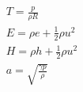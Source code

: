 \documentclass[10pt]{article} %
\begin{document}
\color{fgC}\[\begin{matrix}
T = \frac{p}{\rho R} \\

E = \rho e + \frac{1}{2} \rho u^2 \\

H = \rho h + \frac{1}{2} \rho u^2 \\

a = \sqrt{\frac{\gamma p}{\rho}}
\end{matrix}\]
\end{document}
